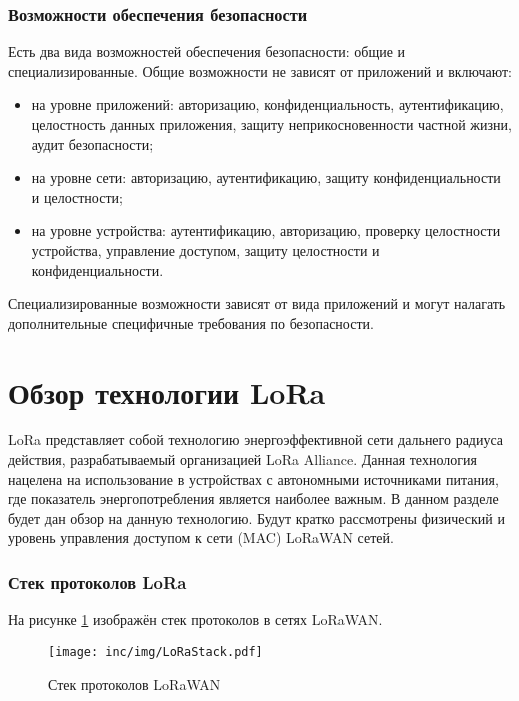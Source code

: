 \subsubsection{Возможности обеспечения безопасности}

Есть два вида возможностей обеспечения безопасности: общие и специализированные.
Общие возможности не зависят от приложений и включают:
\begin{itemize}
	\item на уровне приложений: авторизацию, конфиденциальность, аутентификацию, целостность данных приложения, защиту неприкосновенности частной жизни, аудит безопасности;
	\item на уровне сети: авторизацию, аутентификацию, защиту конфиденциальности и целостности;
	\item на уровне устройства: аутентификацию, авторизацию, проверку целостности устройства, управление доступом, защиту целостности и конфиденциальности.
\end{itemize}

Специализированные возможности зависят от вида приложений и могут налагать дополнительные специфичные требования по безопасности.

\newpage
\section{Обзор технологии LoRa} 

LoRa представляет собой технологию энергоэффективной сети дальнего радиуса действия, разрабатываемый организацией LoRa Alliance.
Данная технология нацелена на использование в устройствах с автономными источниками питания, где показатель энергопотребления является наиболее важным.
В данном разделе будет дан обзор на данную технологию.
Будут кратко рассмотрены физический и уровень управления доступом к сети (MAC) 
LoRaWAN сетей.

\subsubsection{Стек протоколов LoRa}

На рисунке \ref{fig:lorastack} изображён стек протоколов в сетях LoRaWAN. 

\begin{figure}[!h]
  \centering
  \texttt{[image: inc/img/LoRaStack.pdf]}
	\caption{Стек протоколов LoRaWAN}
  \label{fig:lorastack}
\end{figure}


